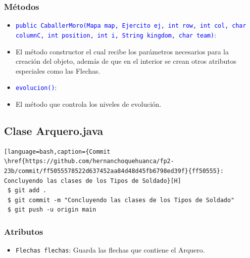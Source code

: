 \documentclass{article}
\begin{document}
\subsubsection{Métodos}
\begin{itemize}
    \item \texttt{\textcolor{blue}{public CaballerMoro(Mapa map, Ejercito ej, int row, int col, char columnC, int position, int i, String kingdom, char team)}}: 
    \item El método constructor el cual recibe los parámetros necesarios para la creación del objeto, además de que en el interior se crean otros atributos especiales como las Flechas.
\end{itemize}

\begin{itemize}
    \item \texttt{\textcolor{blue}{evolucion()}}: 
    \item El método que controla los niveles de evolución. 
\end{itemize}



\newpage
\subsection{Clase Arquero.java}
\begin{lstlisting}[language=bash,caption={Commit \href{https://github.com/hernanchoquehuanca/fp2-23b/commit/ff5055578522d637452aa84d48d45fb6798ed39f}{ff50555}: Concluyendo las clases de los Tipos de Soldado}[H]
 $ git add .
 $ git commit -m "Concluyendo las clases de los Tipos de Soldado"			
 $ git push -u origin main
\end{lstlisting}

\subsubsection{Atributos}
\begin{itemize}
    \item \texttt{Flechas flechas}: Guarda las flechas que contiene el Arquero.
\end{itemize}

\end{document}
